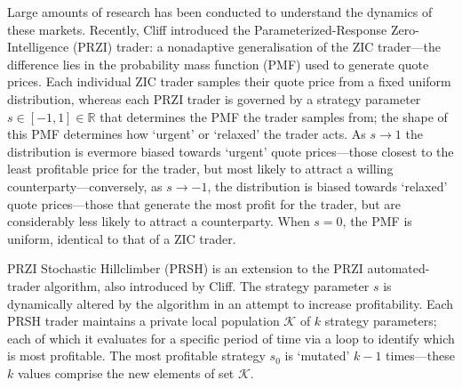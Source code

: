 \documentclass[conference]{IEEEtran}
\begin{document}
Large amounts of research has been conducted to understand the dynamics of these markets.
Recently, Cliff introduced the Parameterized-Response Zero-Intelligence (PRZI) \cite{PRZI} trader: a nonadaptive generalisation of the ZIC \cite{GodeSunder} trader---the difference lies in the probability mass function (PMF) used to generate quote prices.
Each individual ZIC trader samples their quote price from a fixed uniform distribution, whereas each PRZI trader is governed by a strategy parameter $s\in[-1, 1]\in\mathbb{R}$ that determines the PMF the trader samples from; the shape of this PMF determines how `urgent' or `relaxed' the trader acts.
As $s\to1$ the distribution is evermore biased towards `urgent' quote prices---those closest to the least profitable price for the trader, but most likely to attract a willing counterparty---conversely, as $s\to-1$, the distribution is biased towards `relaxed' quote prices---those that generate the most profit for the trader, but are considerably less likely to attract a counterparty.
When $s=0$, the PMF is uniform, identical to that of a ZIC trader.

PRZI Stochastic Hillclimber (PRSH) \cite{PRSH} is an extension to the PRZI automated-trader algorithm, also introduced by Cliff.
The strategy parameter $s$ is dynamically altered by the algorithm in an attempt to increase profitability.
Each PRSH trader maintains a private local population $\mathcal{K}$ of $k$ strategy parameters; each of which it evaluates for a specific period of time via a loop to identify which is most profitable.
The most profitable strategy $s_0$ is `mutated' $k-1$ times---these $k$ values comprise the new elements of set $\mathcal{K}$.
\end{document}

